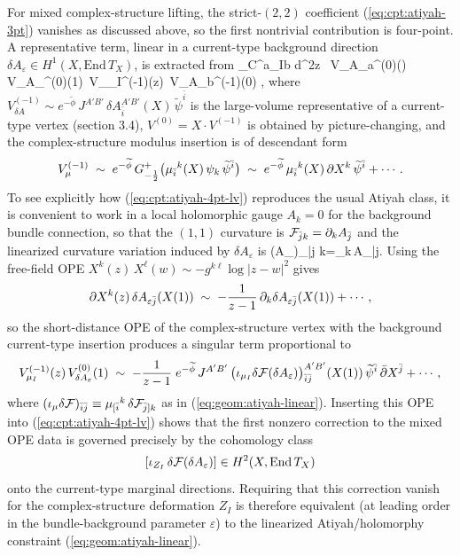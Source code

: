\documentclass[12pt]{article}
\newcommand{\wt}[1]{\widetilde{#1}}
\begin{document}
		For mixed complex-structure lifting, the strict-$(2,2)$ coefficient (\ref{eq:cpt:atiyah-3pt}) vanishes as discussed above, so the first nontrivial contribution is four-point. A representative term, linear in a current-type background direction $\delta A_\varepsilon\in H^{1}(X,\mathrm{End}\,T_X)$, is extracted from
\ie\label{eq:cpt:atiyah-4pt-lv}
\delta_\varepsilon C^{a}{}_{Ib}
\;\propto\;
\int d^2z~\left\langle
	V_{\delta A_a}^{(0)}(\infty)\,
	V_{\delta A_\varepsilon}^{(0)}(1)\,
	V_{\mu_I}^{(-1)}(z)\,
	\overline V_{\delta A_b}^{(-1)}(0)
	\right\rangle,
	\fe
	where $V_{\delta A}^{(-1)}\sim e^{-{\wt\phi}}\,J^{A'B'}\,\delta A_{\bar i}^{A'B'}(X)\,\wt\psi^{\bar i}$ is the large-volume representative of a current-type vertex (section 3.4), $V^{(0)}=X\cdot V^{(-1)}$ is obtained by picture-changing, and the complex-structure modulus insertion is of descendant form
	\[
	V_{\mu}^{(-1)}\;\sim\; e^{-{\wt\phi}}\,G^+_{-{1\over 2}}\big(\mu_{\bar i}{}^{k}(X)\,\psi_{k}\,\wt\psi^{\bar i}\big)
	\;\sim\;
	e^{-{\wt\phi}}\,\mu_{\bar i}{}^{k}(X)\,\partial X^{k}\,\wt\psi^{\bar i}+\cdots.
	\]
	To see explicitly how (\ref{eq:cpt:atiyah-4pt-lv}) reproduces the usual Atiyah class, it is convenient to work in a local holomorphic gauge $A_k=0$ for the background bundle connection, so that the $(1,1)$ curvature is ${\cal F}_{\bar j k}=\partial_k A_{\bar j}$ and the linearized curvature variation induced by $\delta A_\varepsilon$ is
	\ie\label{eq:deltaF_hol_gauge}
	(\delta A_\varepsilon)_{\bar j k}\;=\;\partial_k\,\delta A_{\varepsilon\bar j}.
	\fe
	Using the free-field OPE $X^{k}(z)\,X^{\ell}(w)\sim -g^{k\ell}\log|z-w|^2$ gives
	\[
	\partial X^{k}(z)\,\delta A_{\varepsilon\bar j}(X(1))
	\;\sim\;
	-{1\over z-1}\,\partial_k \delta A_{\varepsilon\bar j}(X(1))+\cdots,
	\]
	so the short-distance OPE of the complex-structure vertex with the background current-type insertion produces a singular term proportional to
	\[
	V_{\mu_I}^{(-1)}(z)\,V_{\delta A_\varepsilon}^{(0)}(1)
	\;\sim\;
	-{1\over z-1}\;
	e^{-{\wt\phi}}\,J^{A'B'}\,
	\big(\iota_{\mu_I}\delta{\cal F}(\delta A_\varepsilon)\big)_{\bar i\bar j}^{A'B'}(X(1))\,
	\wt\psi^{\bar i}\,\bar\partial X^{\bar j}
	+\cdots,
	\]
	where $(\iota_{\mu}\delta{\cal F})_{\bar i\bar j}\equiv \mu_{[\bar i}{}^{k}\,\delta{\cal F}_{\bar j]k}$ as in (\ref{eq:geom:atiyah-linear}). Inserting this OPE into (\ref{eq:cpt:atiyah-4pt-lv}) shows that the first nonzero correction to the mixed OPE data is governed precisely by the cohomology class
	\[
	[\iota_{Z_I}\,\delta{\cal F}(\delta A_\varepsilon)]\in H^{2}(X,\mathrm{End}\,T_X)
	\]
		onto the current-type marginal directions. Requiring that this correction vanish for the complex-structure deformation $Z_I$ is therefore equivalent (at leading order in the bundle-background parameter $\varepsilon$) to the linearized Atiyah/holomorphy constraint (\ref{eq:geom:atiyah-linear}).
		
\end{document}
